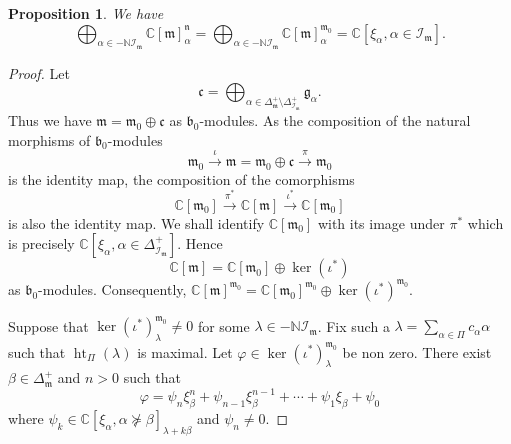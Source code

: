 \documentclass[10pt,a4paper]{amsart}
\newcommand{\height}{\mathop{\mathrm{ht}}\nolimits}
\newcommand{\soc}[1]{\mathcal{I}_{#1}}
\numberwithin{equation}{section}
\theoremstyle{plain}
\newtheorem{proposition}[theorem]{Proposition}
\theoremstyle{definition}
\theoremstyle{remark}
\begin{document}
\begin{proposition}\label{invariant-prop}
We have
$$
\bigoplus_{\alpha\in -\mathbb{N}\soc{\mathfrak{m}}} \mathbb{C} [\mathfrak{m}]_{\alpha}^{\mathfrak{n}}
=
\bigoplus_{\alpha\in -\mathbb{N}\soc{\mathfrak{m}}} \mathbb{C} [\mathfrak{m}]_{\alpha}^{\mathfrak{m}_{0}}
= \mathbb{C}[ \xi_{\alpha} , \alpha \in \soc{\mathfrak{m}}].
$$
\end{proposition}
\begin{proof}
Let 
$$
\mathfrak{c} = \bigoplus_{\alpha\in\Delta_{\mathfrak{m}}^{+} \setminus \Delta_{\soc{\mathfrak{m}}}^{+}}
\mathfrak{g}_{\alpha}.
$$
Thus we have $\mathfrak{m} = \mathfrak{m}_{0} \oplus \mathfrak{c}$ as $\mathfrak{b}_{0}$-modules.
As the composition of the natural morphisms of $\mathfrak{b}_{0}$-modules
$$
\mathfrak{m}_{0}\stackrel{\iota}{\longrightarrow} \mathfrak{m} =\mathfrak{m}_{0} \oplus \mathfrak{c} 
\stackrel{\pi}{\longrightarrow} \mathfrak{m}_{0}
$$
is the identity map, the composition of the comorphisms
$$
\mathbb{C}[ \mathfrak{m}_{0}] \stackrel{\pi^{*}}{\longrightarrow} 
\mathbb{C}[ \mathfrak{m}] \stackrel{\iota^{*}}{\longrightarrow} \mathbb{C}[\mathfrak{m}_{0}]
$$
is also the identity map. We shall identify $\mathbb{C}[\mathfrak{m}_{0}]$ with its image under $\pi^{*}$ 
which is precisely $\mathbb{C}[ \xi_{\alpha} , \alpha \in \Delta_{\soc{\mathfrak{m}}}^{+}]$. Hence 
$$
\mathbb{C}[ \mathfrak{m}]  = \mathbb{C}[ \mathfrak{m}_{0}] \oplus \ker (\iota^{*})
$$
as $\mathfrak{b}_{0}$-modules. Consequently, $\mathbb{C}[ \mathfrak{m}]^{\mathfrak{m}_{0}}
= \mathbb{C}[ \mathfrak{m}_{0}]^{\mathfrak{m}_{0}} \oplus \ker (\iota^{*})^{\mathfrak{m}_{0}}$.

Suppose that $\ker (\iota^{*})^{\mathfrak{m}_{0}}_{\lambda} \neq 0$ for some 
$\lambda\in -\mathbb{N}\soc{\mathfrak{m}}$. Fix such a 
$\lambda = \sum_{\alpha\in\Pi} c_{\alpha}\alpha$ such that $\height_{\Pi} (\lambda )$
is maximal. Let 
$\varphi \in \ker (\iota^{*})^{\mathfrak{m}_{0}}_{\lambda}$ be 
non zero. There exist $\beta\in \Delta_{\mathfrak{m}}^{+}$ and $n > 0$ such that
$$
\varphi = \psi_{n} \xi_{\beta}^{n} + \psi_{n-1} \xi_{\beta}^{n-1} + \cdots  + \psi_{1} \xi_{\beta} + \psi_{0}
$$
where $\psi_{k} \in \mathbb{C}[ \xi_{\alpha} , \alpha \not\succcurlyeq \beta]_{\lambda + k \beta}$
and $\psi_{n}\neq 0$. 


\end{proof}
\end{document}
